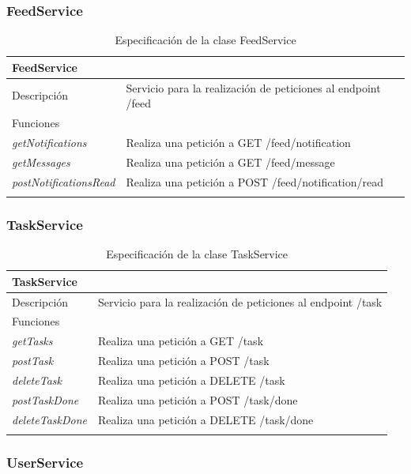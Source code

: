 \subsubsection{FeedService}

\begin{longtable}{|p{} p{}|}
    \hline
    \multicolumn{2}{|l|}{FeedService} \\ \hline \hline
    Descripción      & Servicio para la realización de peticiones al endpoint /feed \\ \hline
    \multicolumn{2}{|l|}{Funciones} \\
    \emph{getNotifications}  & Realiza una petición a GET /feed/notification \\
    \emph{getMessages}  & Realiza una petición a GET /feed/message \\
    \emph{postNotificationsRead}  & Realiza una petición a POST /feed/notification/read \\  \hline
    \caption{Especificación de la clase FeedService}
    \label{class:app:feed_service}
\end{longtable}

\subsubsection{TaskService}

\begin{longtable}{|p{} p{}|}
    \hline
    \multicolumn{2}{|l|}{TaskService} \\ \hline \hline
    Descripción      & Servicio para la realización de peticiones al endpoint /task \\ \hline
    \multicolumn{2}{|l|}{Funciones} \\
    \emph{getTasks}  & Realiza una petición a GET /task \\
    \emph{postTask}  & Realiza una petición a POST /task \\
    \emph{deleteTask}  & Realiza una petición a DELETE /task \\
    \emph{postTaskDone}  & Realiza una petición a POST /task/done \\
    \emph{deleteTaskDone}  & Realiza una petición a DELETE /task/done \\  \hline
    \caption{Especificación de la clase TaskService}
    \label{class:app:task_service}
\end{longtable}

\subsubsection{UserService}

